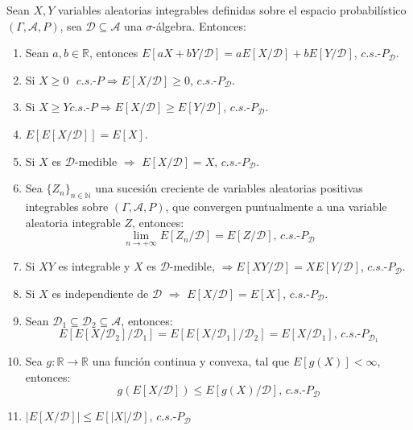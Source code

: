 \begin{proposicion}
Sean $X,Y$ variables aleatorias integrables definidas sobre el espacio probabilístico $(\Gamma, \mathcal{A}, P)$, sea $\mathcal{D}\subseteq \mathcal{A}$ una $\sigma$-álgebra. Entonces:

\begin{enumerate}[label=(\alph*)]
\item \label{PropE2} Sean $a,b\in\mathds{R}$, entonces $E[aX+bY/\mathcal{D}] = aE[X/\mathcal{D}] + bE[Y/\mathcal{D}]$, $c.s.\text{-}P_{\mathcal{D}}$.

\item \label{PropE3} Si $X\geq 0\text{ } c.s.\text{-}P\Rightarrow E[X/\mathcal{D}]\geq 0$, $c.s.\text{-}P_{\mathcal{D}}$.

\item \label{PropE4} Si $X\geq Y c.s.\text{-}P\Rightarrow E[X/\mathcal{D}]\geq E[Y/\mathcal{D}]$, $c.s.\text{-}P_{\mathcal{D}}$.

\item \label{PropE6} $E[E[X/\mathcal{D}]] = E[X]$.

\item \label{PropS1} Si $X$ es $\mathcal{D}$-medible $\Rightarrow$ $E[X/\mathcal{D}] = X$, $c.s.\text{-}P_{\mathcal{D}}$.

\item \label{Prop9} Sea $\{Z_n\}_{n\in\mathds{N}}$ una sucesión creciente de variables aleatorias positivas integrables sobre $(\Gamma, \mathcal{A}, P)$, que convergen puntualmente a una variable aleatoria integrable $Z$, entonces:
$$\lim_{n\to +\infty}E[Z_n/\mathcal{D}] = E[Z/\mathcal{D}]\text{, }c.s.\text{-}P_{\mathcal{D}} $$

\item \label{PropS2} Si $XY$ es integrable y $X$ es $\mathcal{D}$-medible, $\Rightarrow E[XY/\mathcal{D}] = XE[Y/\mathcal{D}]$, $c.s.\text{-}P_{\mathcal{D}}$.

\item \label{PropS3} Si $X$ es independiente de $\mathcal{D}$ $\Rightarrow$ $E[X/\mathcal{D}] = E[X]$, $c.s.\text{-}P_{\mathcal{D}}$.

\item \label{PropS4} Sean $\mathcal{D}_1\subseteq \mathcal{D}_2\subseteq \mathcal{A}$, entonces:
$$E[E[X/\mathcal{D}_2]/\mathcal{D}_1]=E[E[X/\mathcal{D}_1]/\mathcal{D}_2]=E[X/\mathcal{D}_1]\text{, } c.s.\text{-}P_{\mathcal{D}_1}$$

\item \label{PropS5} Sea $g:\mathds{R}\rightarrow \mathds{R}$ una función continua y convexa, tal que $E[g(X)]<\infty$, entonces:
$$g(E[X/\mathcal{D}])\leq E[g(X)/\mathcal{D}]\text{, } c.s.\text{-}P_{\mathcal{D}}$$

\item \label{PropE5} $|E[X/\mathcal{D}]|\leq E[|X|/\mathcal{D}]\text{, } c.s.\text{-}P_{\mathcal{D}}$
\end{enumerate}

\end{proposicion}

